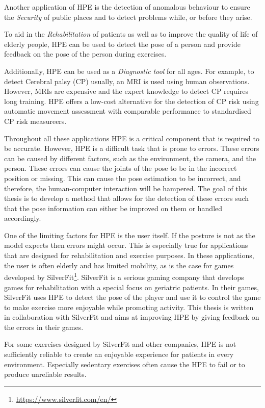Another application of HPE is the detection of anomalous behaviour to ensure the \textit{Security} of public places and to detect problems while, or before they arise.

To aid in the \textit{Rehabilitation} of patients as well as to improve the quality of life of elderly people, HPE can be used to detect the pose of a person and provide feedback on the pose of the person during exercises\cite{ClinicalApplicationChen}. 

Additionally, HPE can be used as a \textit{Diagnostic tool} for all ages. For example, to detect Cerebral palsy (CP) usually, an MRI is used using human observations. However, MRIs are expensive and the expert knowledge to detect CP requires long training. HPE offers a low-cost alternative for the detection of CP risk using automatic movement assessment with comparable performance to standardised CP risk measureers\cite{Stenum2021ApplicationsOP}.

Throughout all these applications HPE is a critical component that is required to be accurate. However, HPE is a difficult task that is prone to errors\cite{HPEIsHard}. These errors can be caused by different factors, such as the environment, the camera, and the person. These errors can cause the joints of the pose to be in the incorrect position or missing. This can cause the pose estimation to be incorrect, and therefore, the human-computer interaction will be hampered. The goal of this thesis is to develop a method that allows for the detection of these errors such that the pose information can either be improved on them or handled accordingly.

One of the limiting factors for HPE is the user itself. If the posture is not as the model expects then errors might occur. This is especially true for applications that are designed for rehabilitation and exercise purposes. In these applications, the user is often elderly and has limited mobility, as is the case for games developed by SilverFit\footnote{\url{https://www.silverfit.com/en/}}. SilverFit is a serious gaming company that develops games for rehabilitation with a special focus on geriatric patients. In their games, SilverFit uses HPE to detect the pose of the player and use it to control the game to make exercise more enjoyable while promoting activity. This thesis is written in collaboration with SilverFit and aims at improving HPE by giving feedback on the errors in their games.

For some exercises designed by SilverFit and other companies, HPE is not sufficiently reliable to create an enjoyable experience for patients in every environment. Especially sedentary exercises often cause the HPE to fail or to produce unreliable results.

